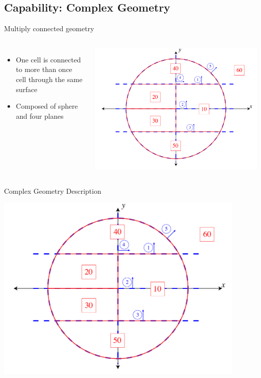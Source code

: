 \documentclass{beamer}
\begin{document}
\subsection{Capability: Complex Geometry}

\begin{frame}{Multiply connected geometry}
\begin{columns}[c]
\begin{itemize}
  \item One cell is connected to more than once cell through the same surface
  \item Composed of sphere and four planes
\end{itemize}

    \includegraphics[width=\textwidth, keepaspectratio]{test_geom_1}
\end{columns}
\end{frame}

\begin{frame}{Complex Geometry Description}
  \begin{center}
    \includegraphics[width=0.9\textwidth, keepaspectratio]{test_geom_1}
  \end{center}
\end{frame}
\end{document}
